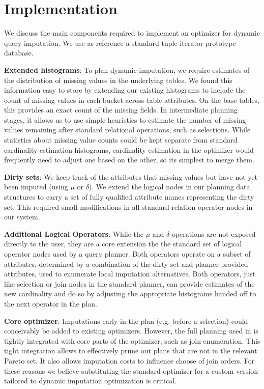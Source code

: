 \section{Implementation}
We discuss the main components required to implement an optimizer for dynamic query imputation. 
We use as reference a standard tuple-iterator prototype database.

\textbf{Extended histograms}: To plan dynamic imputation, we require estimates of the distribution of missing values in
the underlying tables. We found this information easy to store by extending our existing histograms to include the count
of missing values in each bucket across table attributes. On the base tables, this provides an exact count of the
missing fields. In intermediate planning stages, it allows us to use simple heuristics to estimate the number of missing 
values remaining after standard relational operations, such as selections. While statistics about missing value counts
could be kept separate from standard cardinality estimation histograms, cardinality estimation in the optimizer would
frequently need to adjust one based on the other, so its simplest to merge them.

\textbf{Dirty sets}: We keep track of the attributes that missing values but have not yet been imputed (using $\mu$ or $\delta$). We extend
the logical nodes in our planning data structures to carry a set of fully qualified attribute names representing the dirty set. This required 
small modifications in all standard relation operator nodes in our system.

\textbf{Additional Logical Operators}: While the $\mu$ and $\delta$ operations are not exposed directly to the user, they are a core extension
the the standard set of logical operator nodes used by a query planner. Both operators operate on a subset of attributes, determined by
a combination of the dirty set and planner-provided attributes, used to enumerate local imputation alternatives. Both operators, just like
selection or join nodes in the standard planner, can provide estimates of the new cardinality and do so by adjusting the appropriate histograms
handed off to the next operator in the plan.

\textbf{Core optimizer}: Imputations early in the plan (e.g. before a selection) could conceivably be added to existing optimizers. However, the full
planning used in \ProjectName{} is tightly integrated with core parts of the optimizer, such as join enumeration. This tight integration allows \ProjectName{}
to effectively prune out plans that are not in the relevant Pareto set. It also allows imputation costs to influence choose of join orders. For these reasons
we believe substituting the standard optimizer for a custom version tailored to dynamic imputation optimization is critical.


